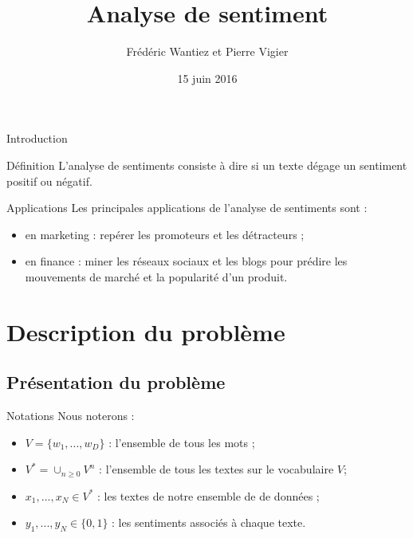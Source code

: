 \documentclass{beamer}
\title[Analyse de sentiment]{Analyse de sentiment}
\author{Frédéric Wantiez et Pierre Vigier}
\institute{Supélec - Projet de synthèse}
\date{15 juin 2016}
\begin{document}
\begin{frame}
\titlepage
\end{frame}


\begin{frame}{Introduction}
\begin{block}{Définition}
L'analyse de sentiments consiste à dire si un texte dégage un sentiment positif ou négatif.
\end{block}

\begin{block}{Applications}
Les principales applications de l'analyse de sentiments sont :
\begin{itemize}
	\item en marketing : repérer les promoteurs et les détracteurs ;
	\item en finance : miner les réseaux sociaux et les blogs pour prédire les mouvements de marché et la popularité d'un produit.
\end{itemize}
\end{block}
\end{frame}

\tableofcontents

\section{Description du problème}

\subsection{Présentation du problème}

\begin{frame}
\begin{block}{Notations}
Nous noterons :
\begin{itemize}
	\item $V=\{w_{1}, ..., w_{D}\}$ : l'ensemble de tous les mots ;
	\item $V^{*}=\cup_{n \geq 0}{V^{n}}$ : l'ensemble de tous les textes sur le vocabulaire $V$;
	\item $x_{1}, ..., x_{N} \in V^{*}$ : les textes de notre ensemble de de données ;
	\item $y_{1}, ..., y_{N} \in \{0, 1\}$ : les sentiments associés à chaque texte.
\end{itemize}
\end{block}
\end{frame}
\end{document}
